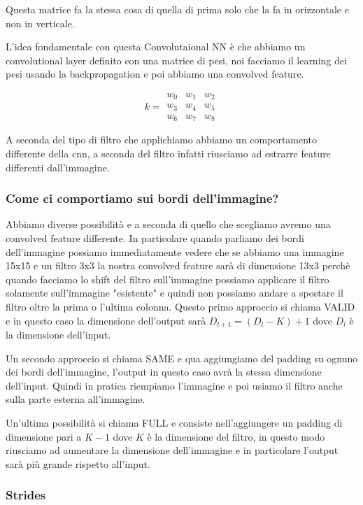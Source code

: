 \documentclass[14pt]{extreport}
\begin{document}
Questa matrice fa la stessa cosa di quella di prima solo che la fa in orizzontale e non in verticale.

L'idea fondamentale con questa Convolutaional NN è che abbiamo un convolutional layer definito con una matrice di pesi, noi facciamo il learning dei
pesi usando la backpropagation e poi abbiamo una convolved feature.

\begin{equation}
	k = \begin{matrix}
		w_0 & w_1 & w_2 \\
		w_3 & w_4 & w_5 \\
		w_6 & w_7 & w_8
	\end{matrix}
\end{equation}


A seconda del tipo di filtro che applichiamo abbiamo un comportamento differente della cnn, a seconda del filtro infatti riusciamo ad estrarre feature
differenti dall'immagine.

\subsubsection{Come ci comportiamo sui bordi dell'immagine?}

Abbiamo diverse possibilità e a seconda di quello che scegliamo avremo una convolved feature differente. In particolare quando parliamo dei bordi
dell'immagine possiamo immediatamente vedere che se abbiamo una immagine 15x15 e un filtro 3x3 la nostra convolved feature sarà di dimensione 13x3
perchè quando facciamo lo shift del filtro sull'immagine possiamo applicare il filtro solamente sull'immagine "esistente" e quindi non possiamo andare
a spostare il filtro oltre la prima o l'ultima colonna. Questo primo approccio si chiama VALID e in questo caso la dimensione dell'output sarà
$D_{l+1} = (D_l - K) + 1$ dove $D_l$ è la dimensione dell'input.

Un secondo approccio si chiama SAME e qua aggiungiamo del padding su ognuno dei bordi dell'immagine, l'output in questo caso avrà la stessa dimensione
dell'input. Quindi in pratica riempiamo l'immagine e poi usiamo il filtro anche sulla parte esterna all'immagine.

Un'ultima possibilità si chiama FULL e consiste nell'aggiungere un padding di dimensione pari a $K-1$ dove $K$ è la dimensione del filtro, in questo
modo riusciamo ad aumentare la dimensione dell'immagine e in particolare l'output sarà più grande rispetto all'input.


\subsubsection{Strides}
\end{document}
